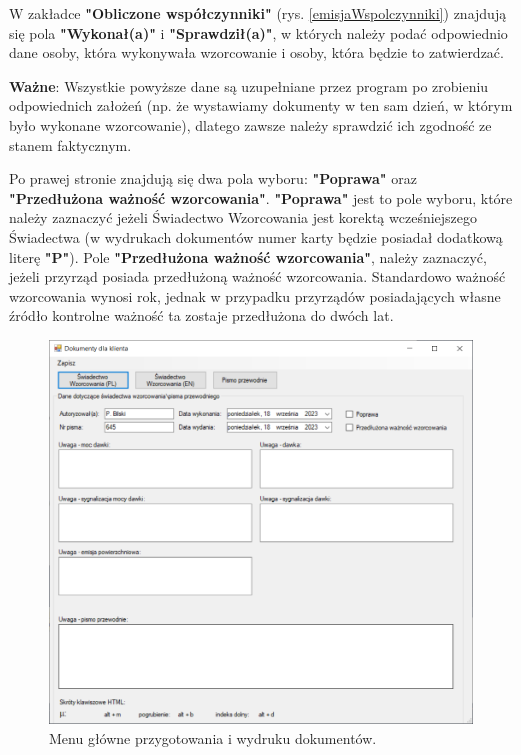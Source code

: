 	W zakładce \textbf{"Obliczone współczynniki"} (rys. \ref{emisjaWspolczynniki}) znajdują się pola \textbf{"Wykonał(a)"} i \textbf{"Sprawdził(a)"}, w których należy podać odpowiednio dane osoby, która wykonywała wzorcowanie i osoby, która będzie to zatwierdzać. 

	\textbf{Ważne}: Wszystkie powyższe dane są uzupełniane przez program po zrobieniu odpowiednich założeń (np. że wystawiamy dokumenty w ten sam dzień, w którym było wykonane wzorcowanie), dlatego zawsze należy sprawdzić ich zgodność ze stanem faktycznym.
	
	Po prawej stronie znajdują się dwa pola wyboru: \textbf{"Poprawa"} oraz \textbf{"Przedłużona ważność wzorcowania"}. \textbf{"Poprawa"} jest to pole wyboru, które należy zaznaczyć jeżeli Świadectwo Wzorcowania jest korektą wcześniejszego Świadectwa (w wydrukach dokumentów numer karty będzie posiadał dodatkową literę \textbf{"P"}). Pole \textbf{"Przedłużona ważność wzorcowania"}, należy zaznaczyć, jeżeli przyrząd posiada przedłużoną ważność wzorcowania. Standardowo ważność wzorcowania wynosi rok, jednak w przypadku przyrządów posiadających własne źródło kontrolne ważność ta zostaje przedłużona do dwóch lat.

	\begin{figure}[htb]
		\centering
		\includegraphics[width=\columnwidth]{obrazki/Wzorcowanie/menu_swiadectwo.png}
		\caption{Menu główne przygotowania i wydruku dokumentów.}
		\label{menuSwiadectwo}
	\end{figure}

